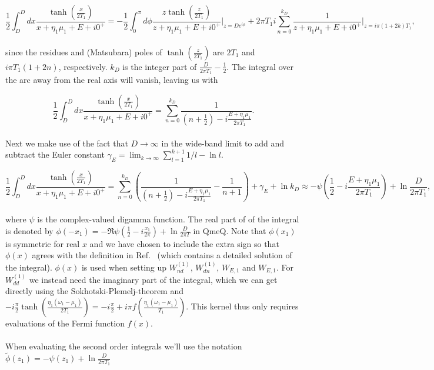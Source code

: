 \documentclass{article}
\begin{document}
\begin{equation}
    \frac{1}{2}\int_D^Ddx \frac{\tanh\left (\frac{x}{2T_1}\right )}{x + \eta_1\mu_1 + E + i0^+} = -\frac{1}{2}\int_0^\pi d\phi \frac{z\tanh\left (\frac{z}{2T_1}\right )}{z + \eta_1\mu_1+ E + i0^+}\Bigg |_{z=De^{i\phi}} + 2\pi T_1 i\sum_{n=0}^{k_D} \frac{1}{z+\eta_1\mu_1 + E+i0^+}\Bigg |_{z=i\pi(1+2k)T_1},
\end{equation}
\\
since the residues and (Matsubara) poles of $\tanh\left ( \frac{z}{2T_1} \right )$ are $2T_1$ and $i\pi T_1(1+2n)$, respectively. $k_D$ is the integer part of $\frac{D}{2\pi T_1}-\frac{1}{2}$. The integral over the arc away from the real axis will vanish, leaving us with

\begin{equation}
   \frac{1}{2}\int_D^Ddx \frac{\tanh\left (\frac{x}{2T_1}\right )}{x + \eta_1\mu_1 + E + i0^+}= \sum_{n=0}^{k_D} \frac{1}{\left ( n+\frac{1}{2}\right ) - i\frac{E+\eta_1\mu_1}{2\pi T_1}}.
\end{equation}
\\
Next we make use of the fact that $D\rightarrow \infty$ in the wide-band limit to add and subtract the Euler constant $\gamma_E=\lim_{k\rightarrow \infty}\sum_{l=1}^{k+1}1/l-\ln l$.

\begin{equation}
   \frac{1}{2}\int_D^Ddx \frac{\tanh\left (\frac{x}{2T_1}\right )}{x + \eta_1\mu_1 + E + i0^+}= \sum_{n=0}^{k_D} \left ( \frac{1}{\left ( n+\frac{1}{2}\right ) - i\frac{E+\eta_1\mu_1}{2\pi T_1}}-\frac{1}{n+1}\right ) + \gamma_E +\ln k_D \approx -\psi\left ( \frac{1}{2}-i\frac{E+\eta_1\mu_1}{2\pi T_1}\right )  + \ln \frac{D}{2\pi T_1},
\end{equation}
\\
where $\psi$ is the complex-valued digamma function. The real part of of the integral is denoted by $\phi(-x_1) = -\Re \psi\left ( \frac{1}{2}-i\frac{x_1}{2\pi}\right )  + \ln \frac{D}{2\pi T}$ in QmeQ. Note that $\phi(x_1)$ is symmetric for real $x$ and we have chosen to include the extra sign so that $\phi(x)$ agrees with the definition in Ref.~\cite{leijnse2008kinetic} (which contains a detailed solution of the integral). $\phi(x)$ is used when setting up $W_{nd}^{(1)}$, $W_{dn}^{(1)}$, $W_{E,1}$ and $W_{E,1}$. For $W_{dd}^{(1)}$ we instead need the imaginary part of the integral, which we can get directly using the Sokhotski-Plemelj-theorem and $-i\frac{\pi}{2}\tanh\left ( \frac{\eta_1(\omega_1-\mu_1)}{2T_1}\right )=-i\frac{\pi}{2}+i\pi f\left(\frac{\eta_1(\omega_1-\mu_1)}{T_1}\right )$. This kernel thus only requires evaluations of the Fermi function $f(x)$.
\\
\\
When evaluating the second order integrals we'll use the notation $\tilde{\phi}(z_1) = -\psi(z_1) + \ln \frac{D}{2\pi T_1}$
\end{document}
